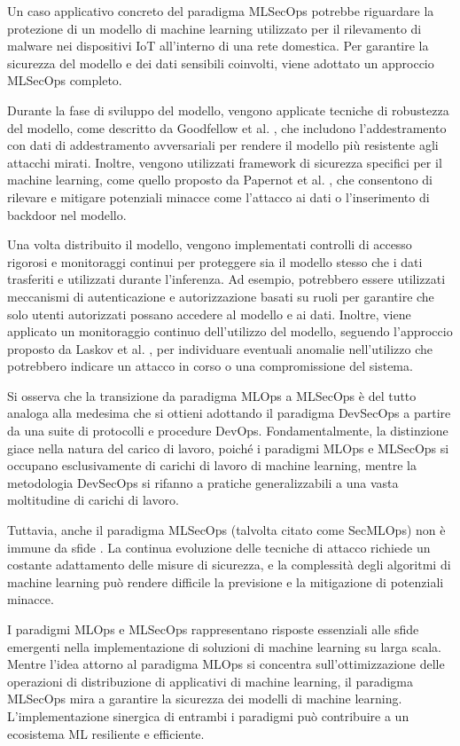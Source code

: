 Un caso applicativo concreto del paradigma MLSecOps potrebbe riguardare la protezione di un modello di machine learning utilizzato per il rilevamento di malware nei dispositivi IoT all'interno di una rete domestica. Per garantire la sicurezza del modello e dei dati sensibili coinvolti, viene adottato un approccio MLSecOps completo.

Durante la fase di sviluppo del modello, vengono applicate tecniche di robustezza del modello, come descritto da Goodfellow et al. \cite{goodfellow2014explaining}, che includono l'addestramento con dati di addestramento avversariali per rendere il modello più resistente agli attacchi mirati. Inoltre, vengono utilizzati framework di sicurezza specifici per il machine learning, come quello proposto da Papernot et al. \cite{papernot2018deep}, che consentono di rilevare e mitigare potenziali minacce come l'attacco ai dati o l'inserimento di backdoor nel modello.

Una volta distribuito il modello, vengono implementati controlli di accesso rigorosi e monitoraggi continui per proteggere sia il modello stesso che i dati trasferiti e utilizzati durante l'inferenza. Ad esempio, potrebbero essere utilizzati meccanismi di autenticazione e autorizzazione basati su ruoli per garantire che solo utenti autorizzati possano accedere al modello e ai dati. Inoltre, viene applicato un monitoraggio continuo dell'utilizzo del modello, seguendo l'approccio proposto da Laskov et al. \cite{laskov2014practical}, per individuare eventuali anomalie nell'utilizzo che potrebbero indicare un attacco in corso o una compromissione del sistema.

Si osserva che la transizione da paradigma MLOps a MLSecOps è del tutto analoga alla medesima che si ottieni adottando il paradigma DevSecOps a partire da una suite di protocolli e procedure DevOps. Fondamentalmente, la distinzione giace nella natura del carico di lavoro, poiché i paradigmi MLOps e MLSecOps si occupano esclusivamente di carichi di lavoro di machine learning, mentre la metodologia DevSecOps si rifanno a pratiche generalizzabili a una vasta moltitudine di carichi di lavoro.

Tuttavia, anche il paradigma MLSecOps (talvolta citato come SecMLOps) non è immune da sfide \cite{adv_ml_2}. La continua evoluzione delle tecniche di attacco richiede un costante adattamento delle misure di sicurezza, e la complessità degli algoritmi di machine learning può rendere difficile la previsione e la mitigazione di potenziali minacce.

I paradigmi MLOps e MLSecOps rappresentano risposte essenziali alle sfide emergenti nella implementazione di soluzioni di machine learning su larga scala. Mentre l'idea attorno al paradigma MLOps si concentra sull'ottimizzazione delle operazioni di distribuzione di applicativi di machine learning, il paradigma MLSecOps mira a garantire la sicurezza dei modelli di machine learning. L'implementazione sinergica di entrambi i paradigmi può contribuire a un ecosistema ML resiliente e efficiente.